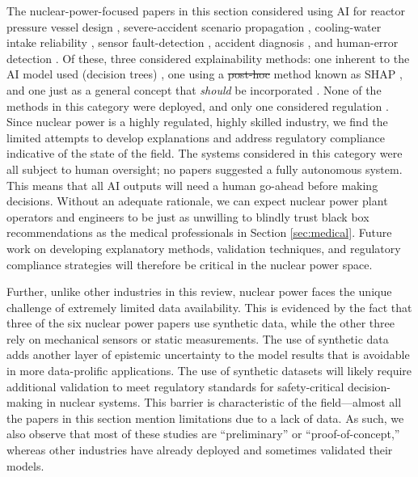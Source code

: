 \documentclass[preprint,12pt]{elsarticle}
\makeatletter
\providecommand{\DIFaddtex}[1]{{\protect\color{blue}\uwave{#1}}} %
\providecommand{\DIFdeltex}[1]{{\protect\color{red}\sout{#1}}} %
\providecommand{\DIFaddbegin}{} %
\providecommand{\DIFaddend}{} %
\providecommand{\DIFdelbegin}{} %
\providecommand{\DIFdelend}{} %
\providecommand{\DIFadd}[1]{\texorpdfstring{\DIFaddtex{#1}}{#1}} %
\providecommand{\DIFdel}[1]{\texorpdfstring{\DIFdeltex{#1}}{}} %
\newcommand{\DIFscaledelfig}{0.5}
\newlength{\DIFdelgraphicswidth} %
\newlength{\DIFdelgraphicsheight} %
\newcommand{\DIFaddincludegraphics}[2][]{{\color{blue}\fbox{\DIFOincludegraphics[#1]{#2}}}} %
\newcommand{\DIFdelincludegraphics}[2][]{%
\sbox{\DIFdelgraphicsbox}{\DIFOincludegraphics[#1]{#2}}%
\settoboxwidth{\DIFdelgraphicswidth}{\DIFdelgraphicsbox} %
\settoboxtotalheight{\DIFdelgraphicsheight}{\DIFdelgraphicsbox} %
\scalebox{\DIFscaledelfig}{%
\parbox[b]{\DIFdelgraphicswidth}{\usebox{\DIFdelgraphicsbox}\\[-\baselineskip] \rule{\DIFdelgraphicswidth}{0em}}\llap{\resizebox{\DIFdelgraphicswidth}{\DIFdelgraphicsheight}{%
\setlength{\unitlength}{\DIFdelgraphicswidth}%
\begin{picture}(1,1)%
\thicklines\linethickness{2pt} %
{\color[rgb]{1,0,0}\put(0,0){\framebox(1,1){}}}%
{\color[rgb]{1,0,0}\put(0,0){\line( 1,1){1}}}%
{\color[rgb]{1,0,0}\put(0,1){\line(1,-1){1}}}%
\end{picture}%
}\hspace*{3pt}}} %
} %
\DeclareRobustCommand{\DIFaddbegin}{\DIFOaddbegin \let\includegraphics\DIFaddincludegraphics} %
\DeclareRobustCommand{\DIFaddend}{\DIFOaddend \let\includegraphics\DIFOincludegraphics} %
\DeclareRobustCommand{\DIFdelbegin}{\DIFOdelbegin \let\includegraphics\DIFdelincludegraphics} %
\DeclareRobustCommand{\DIFdelend}{\DIFOaddend \let\includegraphics\DIFOincludegraphics} %
\let\sout@orig\sout %
\renewcommand{\sout}[1]{\ifmmode\text{\sout@orig{\ensuremath{#1}}}\else\sout@orig{#1}\fi} %
\makeatother
\begin{document}
The nuclear-power-focused papers in this section considered using AI for reactor
pressure vessel design \cite{yaoMechanicalBehaviorsInternal2024},
severe-accident scenario propagation
\cite{hossnyDistinctivePhysicalInsights2023}, cooling-water intake reliability
\cite{zhaoHumanmachineCooperationSafety2024}, sensor fault-detection
\cite{hongFaultIdentificationSignal2026}, accident diagnosis
\cite{chaeGraphNeuralNetwork2022}, and human-error detection
\cite{reddyUncertaintyawareExplainableHuman2024}. Of these, three considered
explainability methods: one inherent to the AI model used (decision trees)
\cite{hossnyDistinctivePhysicalInsights2023}, one using a \DIFdelbegin \DIFdel{post-hoc }\DIFdelend \DIFaddbegin \DIFadd{post hoc }\DIFaddend method known
as SHAP \cite{reddyUncertaintyawareExplainableHuman2024}, and one just as a
general concept that \textit{should} be incorporated
\cite{zhaoHumanmachineCooperationSafety2024}. None of the methods in this
category were deployed, and only one considered regulation
\cite{hongFaultIdentificationSignal2026}. Since nuclear power is a highly
regulated, highly skilled industry, we find the limited attempts to develop
explanations and address regulatory compliance indicative of the state of the
field. The systems considered in this category were all subject to human
oversight; no papers suggested a fully autonomous system. This means that all AI
outputs will need a human go-ahead before making decisions. Without an adequate
rationale, we can expect nuclear power plant operators and engineers to be just
as unwilling to blindly trust black box recommendations as the medical
professionals in Section \ref{sec:medical}. Future work on developing
explanatory methods, validation techniques, and regulatory compliance strategies
will therefore be critical in the nuclear power space. 

Further, unlike other industries in this review, nuclear power faces the unique
challenge of extremely limited data availability. This is evidenced by the fact
that three of the six nuclear power papers use synthetic data, while the other
three rely on mechanical sensors or static measurements. The use of synthetic
data adds another layer of epistemic uncertainty to the model results that is
avoidable in more data-prolific applications. The use of synthetic datasets will
likely require additional validation to meet regulatory standards for
safety-critical decision-making in nuclear systems. This barrier is
characteristic of the field---almost all the papers in this section mention
limitations due to a lack of data. As such, we also observe that most of these
studies are ``preliminary'' or ``proof-of-concept,'' whereas other industries
have already deployed and sometimes validated their models. 
\end{document}
